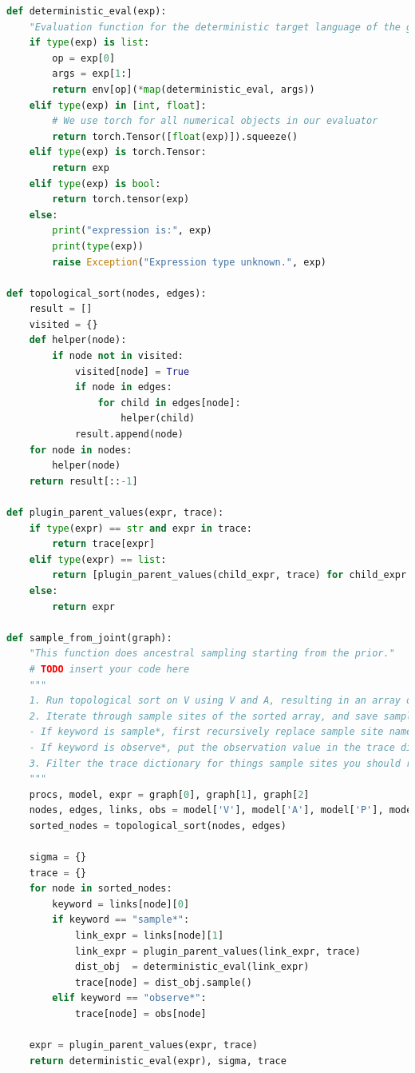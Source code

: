 \documentclass[12pt]{article}%
\theoremstyle{definition}
\begin{document}
	\begin{lstlisting}[language=Python]
def deterministic_eval(exp):
    "Evaluation function for the deterministic target language of the graph based representation."
    if type(exp) is list:
        op = exp[0]
        args = exp[1:]
        return env[op](*map(deterministic_eval, args))
    elif type(exp) in [int, float]:
        # We use torch for all numerical objects in our evaluator
        return torch.Tensor([float(exp)]).squeeze()
    elif type(exp) is torch.Tensor:
        return exp
    elif type(exp) is bool:
        return torch.tensor(exp)
    else:
        print("expression is:", exp)
        print(type(exp))
        raise Exception("Expression type unknown.", exp)

def topological_sort(nodes, edges):
    result = []
    visited = {}
    def helper(node):
        if node not in visited:
            visited[node] = True
            if node in edges:
                for child in edges[node]:
                    helper(child)
            result.append(node)
    for node in nodes:
        helper(node)
    return result[::-1]

def plugin_parent_values(expr, trace):
    if type(expr) == str and expr in trace:
        return trace[expr]
    elif type(expr) == list:
        return [plugin_parent_values(child_expr, trace) for child_expr in expr]
    else:
        return expr

def sample_from_joint(graph):
    "This function does ancestral sampling starting from the prior."
    # TODO insert your code here
    """
    1. Run topological sort on V using V and A, resulting in an array of v's
    2. Iterate through sample sites of the sorted array, and save sampled results on trace dictionary using P and Y
    - If keyword is sample*, first recursively replace sample site names with trace values in the expression from P. Then, run deterministic_eval.
    - If keyword is observe*, put the observation value in the trace dictionary
    3. Filter the trace dictionary for things sample sites you should return
    """
    procs, model, expr = graph[0], graph[1], graph[2]
    nodes, edges, links, obs = model['V'], model['A'], model['P'], model['Y']
    sorted_nodes = topological_sort(nodes, edges)

    sigma = {}
    trace = {}
    for node in sorted_nodes:
        keyword = links[node][0]
        if keyword == "sample*":
            link_expr = links[node][1]
            link_expr = plugin_parent_values(link_expr, trace)
            dist_obj  = deterministic_eval(link_expr)
            trace[node] = dist_obj.sample()
        elif keyword == "observe*":
            trace[node] = obs[node]

    expr = plugin_parent_values(expr, trace)
    return deterministic_eval(expr), sigma, trace
	\end{lstlisting}
	
\end{document}
